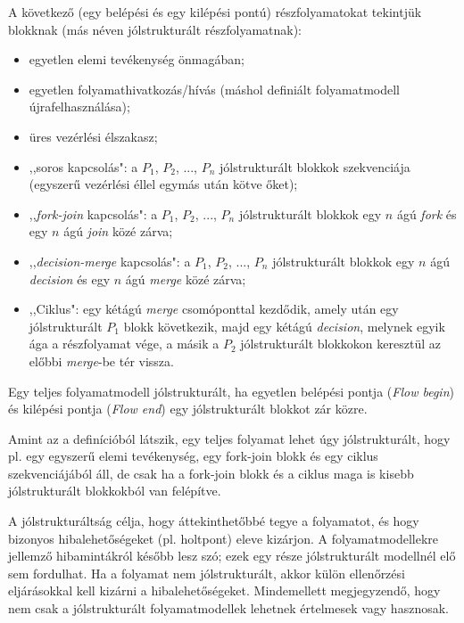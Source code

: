 \begin{definicio}
A következő (egy belépési és egy kilépési pontú) részfolyamatokat tekintjük  blokknak (más néven jólstrukturált részfolyamatnak):

\begin{itemize}
\item egyetlen elemi tevékenység önmagában;
\item egyetlen folyamathivatkozás/hívás (máshol definiált folyamatmodell újrafelhasználása);
\item üres vezérlési élszakasz;
\item ,,soros kapcsolás": a $P_1$, $P_2$, ..., $P_n$ jólstrukturált blokkok szekvenciája (egyszerű vezérlési éllel egymás után kötve őket);
\item ,,\emph{fork-join} kapcsolás": a $P_1$, $P_2$, ..., $P_n$ jólstrukturált blokkok egy $n$ ágú \emph{fork} és egy $n$ ágú \emph{join} közé zárva;
\item ,,\emph{decision-merge} kapcsolás": a $P_1$, $P_2$, ..., $P_n$ jólstrukturált blokkok egy $n$ ágú \emph{decision} és egy $n$ ágú \emph{merge} közé zárva;
\item ,,Ciklus": egy kétágú \emph{merge} csomóponttal kezdődik, amely után egy jólstrukturált $P_1$ blokk következik, majd egy kétágú \emph{decision}, melynek egyik ága a részfolyamat vége, a másik a $P_2$ jólstrukturált blokkokon keresztül az előbbi \emph{merge}-be tér vissza.
\end{itemize}
Egy teljes folyamatmodell jólstrukturált, ha egyetlen belépési pontja (\emph{Flow begin}) és kilépési pontja (\emph{Flow end}) egy jólstrukturált blokkot zár közre.
\end{definicio}

Amint az a definícióból látszik, egy teljes folyamat lehet úgy jólstrukturált, hogy pl. egy egyszerű elemi tevékenység, egy fork-join blokk és egy ciklus szekvenciájából áll, de csak ha a fork-join blokk és a ciklus maga is kisebb jólstrukturált blokkokból van felépítve.

A jólstrukturáltság célja, hogy áttekinthetőbbé tegye a folyamatot, és hogy bizonyos hibalehetőségeket (pl. holtpont) eleve kizárjon. A folyamatmodellekre jellemző hibamintákról később lesz szó; ezek egy része jólstrukturált modellnél elő sem fordulhat. Ha a folyamat nem jólstrukturált, akkor külön ellenőrzési eljárásokkal kell kizárni a hibalehetőségeket. Mindemellett megjegyzendő, hogy nem csak a jólstrukturált folyamatmodellek lehetnek értelmesek vagy hasznosak. %

